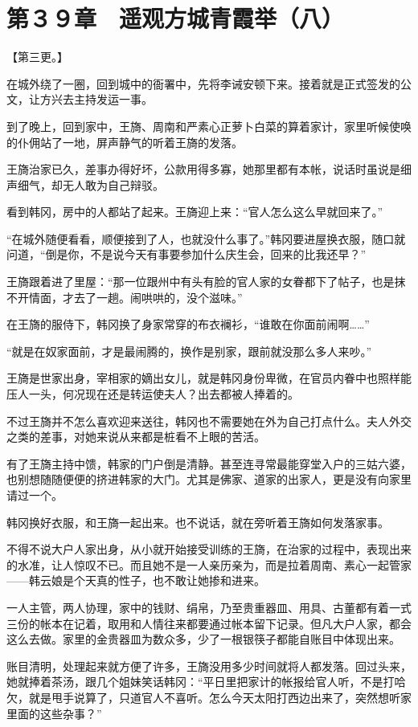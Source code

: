 \section{第３９章　遥观方城青霞举（八）}

【第三更。】

在城外绕了一圈，回到城中的衙署中，先将李诫安顿下来。接着就是正式签发的公文，让方兴去主持发运一事。

到了晚上，回到家中，王旖、周南和严素心正萝卜白菜的算着家计，家里听候使唤的仆佣站了一地，屏声静气的听着王旖的发落。

王旖治家已久，差事办得好坏，公款用得多寡，她那里都有本帐，说话时虽说是细声细气，却无人敢为自己辩驳。

看到韩冈，房中的人都站了起来。王旖迎上来：“官人怎么这么早就回来了。”

“在城外随便看看，顺便接到了人，也就没什么事了。”韩冈要进屋换衣服，随口就问道，“倒是你，不是说今天有事要参加什么庆生会，回来的比我还早？”

王旖跟着进了里屋：“那一位跟州中有头有脸的官人家的女眷都下了帖子，也是抹不开情面，才去了一趟。闹哄哄的，没个滋味。”

在王旖的服侍下，韩冈换了身家常穿的布衣襕衫，“谁敢在你面前闹啊……”

“就是在奴家面前，才是最闹腾的，换作是别家，跟前就没那么多人来吵。”

王旖是世家出身，宰相家的嫡出女儿，就是韩冈身份卑微，在官员内眷中也照样能压人一头，何况现在还是转运使夫人？出去都被人捧着的。

不过王旖并不怎么喜欢迎来送往，韩冈也不需要她在外为自己打点什么。夫人外交之类的差事，对她来说从来都是桩看不上眼的苦活。

有了王旖主持中馈，韩家的门户倒是清静。甚至连寻常最能穿堂入户的三姑六婆，也别想随随便便的挤进韩家的大门。尤其是佛家、道家的出家人，更是没有向家里请过一个。

韩冈换好衣服，和王旖一起出来。也不说话，就在旁听着王旖如何发落家事。

不得不说大户人家出身，从小就开始接受训练的王旖，在治家的过程中，表现出来的水准，让人惊叹不已。而且她不是一人亲历亲为，而是拉着周南、素心一起管家——韩云娘是个天真的性子，也不敢让她掺和进来。

一人主管，两人协理，家中的钱财、绢帛，乃至贵重器皿、用具、古董都有着一式三份的帐本在记着，取用和人情往来都要通过帐本留下记录。但凡大户人家，都会这么去做。家里的金贵器皿为数众多，少了一根银筷子都能自账目中体现出来。

账目清明，处理起来就方便了许多，王旖没用多少时间就将人都发落。回过头来，她就捧着茶汤，跟几个姐妹笑话韩冈：“平日里把家计的帐报给官人听，不是打哈欠，就是甩手说算了，只道官人不喜听。怎么今天太阳打西边出来了，突然想听家里面的这些杂事？”

